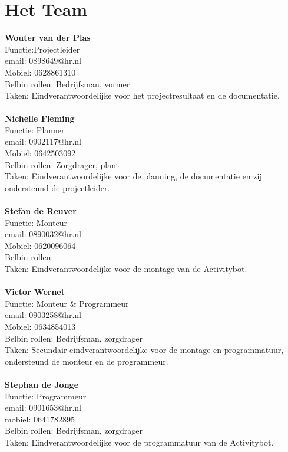 \documentclass[oneside]{book}
\begin{document}
\section{Het Team}
\textbf{Wouter van der Plas}\\
Functie:Projectleider\\
email: 0898649@hr.nl\\
Mobiel: 0628861310\\
Belbin rollen: Bedrijfsman, vormer\\
Taken: Eindverantwoordelijke voor het  projectresultaat en de documentatie.\\
\\
\textbf{Nichelle Fleming}\\
Functie: Planner\\
email: 0902117@hr.nl\\
Mobiel: 0642503092\\
Belbin rollen: Zorgdrager, plant\\
Taken: Eindverantwoordelijke voor de planning, de documentatie en zij ondersteund de projectleider.\\
\\
\textbf{Stefan de Reuver}\\
Functie: Monteur\\
email: 0890032@hr.nl\\
Mobiel: 0620096064\\
Belbin rollen:\\
Taken: Eindverantwoordelijke voor de montage van de Activitybot.\\
\\
\textbf{Victor Wernet}\\
Functie: Monteur \& Programmeur\\
email: 0903258@hr.nl\\
Mobiel: 0634854013\\
Belbin rollen: Bedrijfsman, zorgdrager\\
Taken: Secundair eindverantwoordelijke voor de montage en programmatuur, ondersteund de monteur en de programmeur.\\
\\
\textbf{Stephan de Jonge}\\
Functie: Programmeur\\
email: 0901653@hr.nl\\
mobiel: 0641782895\\
Belbin rollen: Bedrijfsman, zorgdrager\\
Taken: Eindverantwoordelijke voor de programmatuur van de Activitybot.
\end{document}
